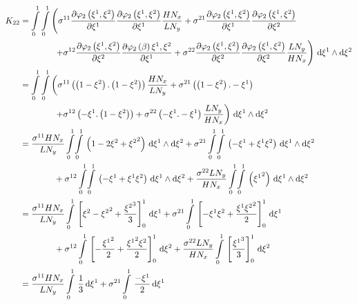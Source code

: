 \begin{equation}
  \begin{aligned}
    K_{22}&=\dintl{0}{1}\dintl{0}{1}\left(
    \conductivitytensorsymbol^{11}\delby{\lbfn{2}{\xione,\xitwo}}{\xione}
    \delby{\lbfn{2}{\xione,\xitwo}}{\xione}\dfrac{H N_{x}}{L N_{y}}+
    \conductivitytensorsymbol^{21}\delby{\lbfn{2}{\xione,\xitwo}}{\xione}
    \delby{\lbfn{2}{\xione,\xitwo}}{\xitwo}\right.\\
    &\qquad\qquad\left.+\conductivitytensorsymbol^{12}\delby{\lbfn{2}{\xione,\xitwo}}{\xitwo}
    \delby{\lbfn{2}{\beta}{\xione,\xitwo}}{\xione}+
    \conductivitytensorsymbol^{22}\delby{\lbfn{2}{\xione,\xitwo}}{\xitwo}
    \delby{\lbfn{2}{\xione,\xitwo}}{\xitwo}\dfrac{L N_{y}}{H N_{x}}\right)\infinitesimaltwo{\xione}{\xitwo}\\
    &=\dintl{0}{1}\dintl{0}{1}\left(
    \conductivitytensorsymbol^{11}\pbrac{\pbrac{1-\xitwo}.\pbrac{1-\xitwo}}\dfrac{H N_{x}}{L N_{y}}+
    \conductivitytensorsymbol^{21}\pbrac{\pbrac{1-\xitwo}.-\xione}\right.\\
    &\qquad\qquad\left.+\conductivitytensorsymbol^{12}\pbrac{-\xione.\pbrac{1-\xitwo}}+
    \conductivitytensorsymbol^{22}\pbrac{-\xione.-\xione}\dfrac{L N_{y}}{H N_{x}}\right)
    \infinitesimaltwo{\xione}{\xitwo}\\
    &=\dfrac{\conductivitytensorsymbol^{11} H N_{x}}{L N_{y}}\giint{0}{1}{0}{1}{\pbrac{1-2\xitwo+\xitwosq}}{\xione}{\xitwo}
    +\conductivitytensorsymbol^{21}\giint{0}{1}{0}{1}{\pbrac{-\xione+\xione\xitwo}}{\xione}{\xitwo}\\
    &\qquad\qquad+\conductivitytensorsymbol^{12}\giint{0}{1}{0}{1}{\pbrac{-\xione+\xione\xitwo}}{\xione}{\xitwo}
    +\dfrac{\conductivitytensorsymbol^{22} L N_{y}}{H N_{x}}\giint{0}{1}{0}{1}{\pbrac{\xionesq}}{\xione}{\xitwo} \\
    &=\dfrac{\conductivitytensorsymbol^{11} H N_{x}}{L N_{y}}\gint{0}{1}{\sqbrac{\xitwo-\xitwosq+\dfrac{\xitwocube}{3}}^{1}_{0}}{\xione}
    +\conductivitytensorsymbol^{21}\gint{0}{1}{\sqbrac{-\xione\xitwo+\dfrac{\xione\xitwosq}{2}}^{1}_{0}}{\xione}\\
    &\qquad\qquad+\conductivitytensorsymbol^{12}\gint{0}{1}{\sqbrac{-\dfrac{\xionesq}{2}+\dfrac{\xionesq\xitwo}{2}}^{1}_{0}}{\xitwo}
    +\dfrac{\conductivitytensorsymbol^{22} L N_{y}}{H N_{x}}\gint{0}{1}{\sqbrac{\dfrac{\xionecube}{3}}^{1}_{0}}{\xitwo} \\
    &=\dfrac{\conductivitytensorsymbol^{11} H N_{x}}{L N_{y}}\gint{0}{1}{\dfrac{1}{3}}{\xione}
    +\conductivitytensorsymbol^{21}\gint{0}{1}{\dfrac{-\xione}{2}}{\xione}

\end{aligned}
\end{equation}
